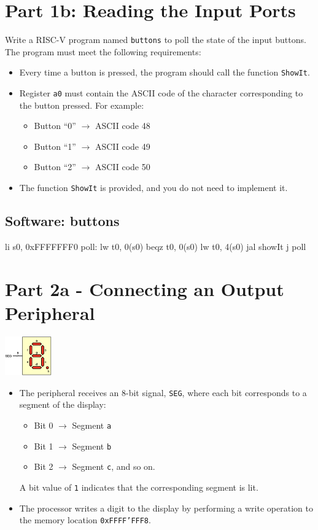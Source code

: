 \section{Part 1b: Reading the Input Ports}
Write a RISC-V program named \texttt{buttons} to poll the state of the input buttons. The program must meet the following requirements:

\begin{itemize}
    \item Every time a button is pressed, the program should call the function \texttt{ShowIt}.
    \item Register \texttt{a0} must contain the ASCII code of the character corresponding to the button pressed. For example:
    \begin{itemize}
        \item Button ``0'' $\rightarrow$ ASCII code 48
        \item Button ``1'' $\rightarrow$ ASCII code 49
        \item Button ``2'' $\rightarrow$ ASCII code 50
    \end{itemize}
    \item The function \texttt{ShowIt} is provided, and you do not need to implement it.
\end{itemize}

\subsection{Software: buttons}
\begin{assembly}
    li s0, 0xFFFFFFF0
poll:    
    lw t0, 0(s0)
    beqz t0, 0(s0)
    lw t0, 4(s0)
    jal showIt
    j poll
\end{assembly}

\section{Part 2a - Connecting an Output Peripheral}
\begin{center}
    \includegraphics[width=0.15\textwidth]{chapters/chapter2e/images/seg8.png}
\end{center}
\begin{itemize}
    \item[] The peripheral receives an 8-bit signal, \texttt{SEG}, where each bit corresponds to a segment of the display:
    \begin{itemize}
        \item Bit 0 $\rightarrow$ Segment \texttt{a}
        \item Bit 1 $\rightarrow$ Segment \texttt{b}
        \item Bit 2 $\rightarrow$ Segment \texttt{c}, and so on.
    \end{itemize}
    A bit value of \texttt{1} indicates that the corresponding segment is lit.
    \item[] The processor writes a digit to the display by performing a write operation to the memory location \texttt{0xFFFF'FFF8}.
\end{itemize}
